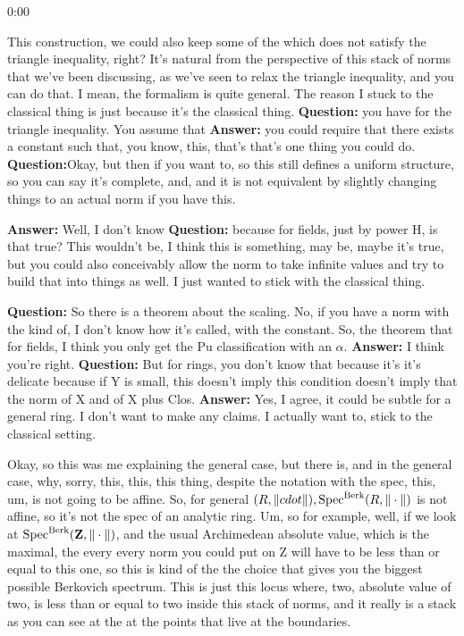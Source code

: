 \begin{unfinished}{0:00}
{%

This construction, we could also keep some of the which does not satisfy the triangle inequality, right? 
It's natural from the perspective of this stack of norms that we've been discussing, as we've seen to relax the triangle inequality, and you can do that. I mean, the formalism is quite general.
The reason I stuck to the classical thing is just because it's the classical thing.
\textbf{Question:} you have for the triangle inequality. You assume that 
\textbf{Answer:}  you could require that there exists a constant such that, you know, this, that's that's one thing you could do. 
\textbf{Question:}Okay, but then if you want to, so this still defines a uniform structure, so you can say it's complete, and, and it is not equivalent by slightly changing things to an actual norm if you have this. 

\textbf{Answer:} Well, I don't know 
\textbf{Question:} because for fields, just by power H, is that true? This wouldn't be, I think this is something, may be, maybe it's true, but you could also conceivably allow the norm to take infinite values and try to build that into things as well. I just wanted to stick with the classical thing.

\textbf{Question:} So there is a theorem about the scaling. No, if you have a norm with the kind of, I don't know how it's called, with the constant. So, the theorem that for fields, I think you only get the Pu classification with an $\alpha$. 
\textbf{Answer:} I think you're right. 
\textbf{Question:} But for rings, you don't know that because it's it's delicate because if Y is small, this doesn't imply this condition doesn't imply that the norm of X and of X plus Clos.
\textbf{Answer:} Yes, I agree, it could be subtle for a general ring. I don't want to make any claims. I actually want to, stick to the classical setting.

Okay, so this was me explaining the general case, but there is, and in the general case, why, sorry, this, this, this thing, despite the notation with the spec, this, um, is not going to be affine. So, for general $(R, \| cdot \|), \operatorname{Spec}^{\mathrm{Berk}} (R, \| \cdot \|)$ is not affine, so it's not the spec of an analytic ring. Um, so for example, well, if we look at $\operatorname{Spec}^{\mathrm{Berk}} (\mathbf Z, \| \cdot \|)$, and the usual Archimedean absolute value, which is the maximal, the every every norm you could put on Z will have to be less than or equal to this one, so this is kind of the the choice that gives you the biggest possible Berkovich spectrum. This is just this locus where, two, absolute value of two, is less than or equal to two inside this stack of norms, and it really is a stack as you can see at the at the points that live at the boundaries.

}
\end{unfinished}

